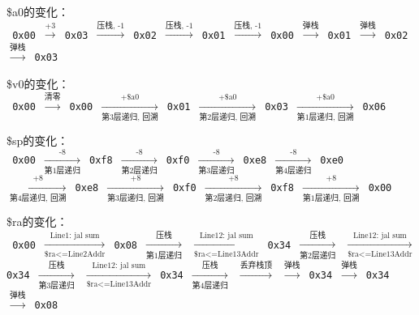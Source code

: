 \documentclass{article}
\begin{document}
            \$a0的变化： \\
            \texttt{
            0x00 $\xrightarrow{\text{+3}}$ 0x03 $\xrightarrow{\text{压栈, -1}}$ 0x02 $\xrightarrow{\text{压栈, -1}}$ 0x01 $\xrightarrow{\text{压栈, -1}}$ 0x00 $\xrightarrow{\text{弹栈}}$ 0x01 $\xrightarrow{\text{弹栈}}$ 0x02 $\xrightarrow{\text{弹栈}}$ 0x03
            ~\\}

            \$v0的变化： \\
            \texttt{
            0x00 $\xrightarrow{\text{清零}}$ 0x00 $\xrightarrow[\text{第3层递归, 回溯}]{\text{+\$a0}}$ 0x01 $\xrightarrow[\text{第2层递归, 回溯}]{\text{+\$a0}}$ 0x03 $\xrightarrow[\text{第1层递归, 回溯}]{\text{+\$a0}}$ 0x06
            ~\\}

            \$sp的变化： \\
            \texttt{
            0x00 $\xrightarrow[\text{第1层递归}]{\text{-8}}$ 0xf8 $\xrightarrow[\text{第2层递归}]{\text{-8}}$ 0xf0 $\xrightarrow[\text{第3层递归}]{\text{-8}}$ 0xe8 $\xrightarrow[\text{第4层递归}]{\text{-8}}$ 0xe0 \\
            $\xrightarrow[\text{第4层递归, 回溯}]{\text{+8}}$ 0xe8 $\xrightarrow[\text{第3层递归, 回溯}]{\text{+8}}$ 0xf0 $\xrightarrow[\text{第2层递归, 回溯}]{\text{+8}}$ 0xf8 $\xrightarrow[\text{第1层递归, 回溯}]{\text{+8}}$ 0x00
            ~\\}

            \$ra的变化： \\
            \texttt{
            0x00 $\xrightarrow[\text{\$ra<=Line2Addr}]{\text{Line1: jal sum}}$ 0x08 $\xrightarrow[\text{第1层递归}]{\text{压栈}}$ $\xrightarrow[\text{\$ra<=Line13Addr}]{\text{Line12: jal sum}}$ 0x34 $\xrightarrow[\text{第2层递归}]{\text{压栈}}$ $\xrightarrow[\text{\$ra<=Line13Addr}]{\text{Line12: jal sum}}$ 0x34 $\xrightarrow[\text{第3层递归}]{\text{压栈}}$ $\xrightarrow[\text{\$ra<=Line13Addr}]{\text{Line12: jal sum}}$ 0x34 $\xrightarrow[\text{第4层递归}]{\text{压栈}}$ $\xrightarrow{\text{丢弃栈顶}}$ $\xrightarrow{\text{弹栈}}$ 0x34 $\xrightarrow{\text{弹栈}}$ 0x34 $\xrightarrow{\text{弹栈}}$ 0x08
            }
\end{document}
